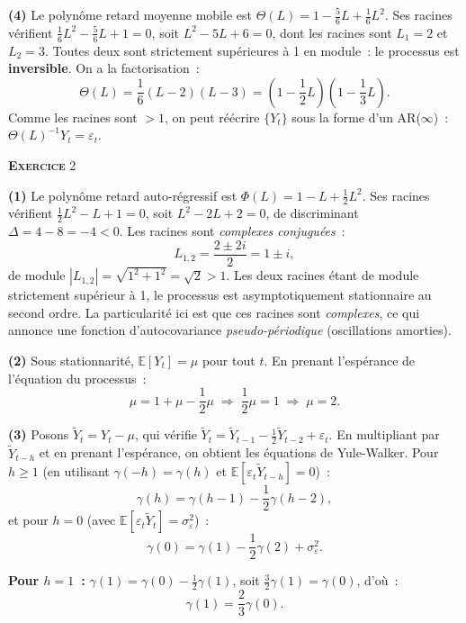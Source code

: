 \documentclass[11pt,a4paper,notitlepage]{article}
\newcommand{\exercice}[1]{\textsc{\textbf{Exercice}} #1}
\newcommand{\question}[1]{\textbf{(#1)}}
\begin{document}
\question{4} Le polynôme retard moyenne mobile est $\Theta(L) = 1 -
\frac{5}{6}L + \frac{1}{6}L^2$. Ses racines vérifient $\frac{1}{6}L^2 -
\frac{5}{6}L + 1 = 0$, soit $L^2 - 5L + 6 = 0$, dont les racines sont
$L_1 = 2$ et $L_2 = 3$. Toutes deux sont strictement supérieures à 1 en
module~: le processus est \textbf{inversible}. On a la
factorisation~:
\[
\Theta(L) = \frac{1}{6}(L-2)(L-3)
= \left(1-\frac{1}{2}L\right)\left(1-\frac{1}{3}L\right).
\]
Comme les racines sont $>1$, on peut réécrire $\{Y_t\}$ sous la forme
d'un AR($\infty$)~: $\Theta(L)^{-1}Y_t = \varepsilon_t$.

\bigskip

\exercice{2}\newline

\question{1} Le polynôme retard auto-régressif est $\Phi(L) = 1 - L +
\frac{1}{2}L^2$. Ses racines vérifient $\frac{1}{2}L^2 - L + 1 = 0$,
soit $L^2 - 2L + 2 = 0$, de discriminant $\Delta = 4 - 8 = -4 < 0$. Les
racines sont \emph{complexes conjuguées}~:
\[
L_{1,2} = \frac{2 \pm 2i}{2} = 1 \pm i,
\]
de module $|L_{1,2}| = \sqrt{1^2+1^2} = \sqrt{2} > 1$. Les deux racines
étant de module strictement supérieur à 1, le processus est
asymptotiquement stationnaire au second ordre. La particularité ici est
que ces racines sont \emph{complexes}, ce qui annonce une fonction
d'autocovariance \emph{pseudo-périodique} (oscillations amorties).\newline

\question{2} Sous stationnarité, $\mathbb E[Y_t] = \mu$ pour tout $t$.
En prenant l'espérance de l'équation du processus~:
\[
\mu = 1 + \mu - \frac{1}{2}\mu \;\Longrightarrow\;
\frac{1}{2}\mu = 1 \;\Longrightarrow\; \mu = 2.
\]
\newline

\question{3} Posons $\tilde Y_t = Y_t - \mu$, qui vérifie $\tilde Y_t =
\tilde Y_{t-1} - \frac{1}{2}\tilde Y_{t-2} + \varepsilon_t$. En
multipliant par $\tilde Y_{t-h}$ et en prenant l'espérance, on obtient
les équations de Yule-Walker. Pour $h\geq 1$ (en utilisant
$\gamma(-h)=\gamma(h)$ et $\mathbb E[\varepsilon_t\tilde Y_{t-h}]=0$)~:
\[
\gamma(h) = \gamma(h-1) - \frac{1}{2}\gamma(h-2),
\]
et pour $h=0$ (avec $\mathbb E[\varepsilon_t\tilde Y_t] =
\sigma_{\varepsilon}^2$)~:
\[
\gamma(0) = \gamma(1) - \frac{1}{2}\gamma(2) + \sigma_{\varepsilon}^2.
\]

\textbf{Pour $h=1$~:} $\gamma(1) = \gamma(0) - \frac{1}{2}\gamma(1)$,
soit $\frac{3}{2}\gamma(1) = \gamma(0)$, d'où~:
\[
\gamma(1) = \frac{2}{3}\gamma(0).
\]
\end{document}
